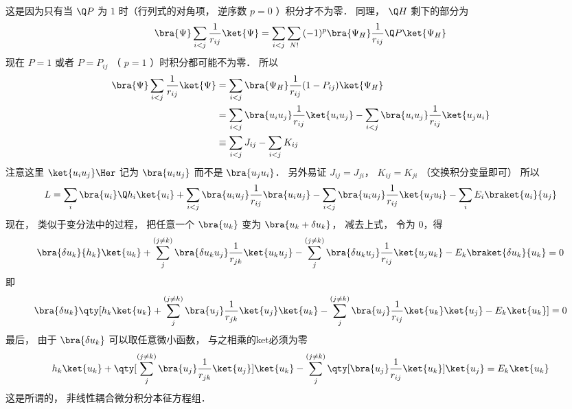 这是因为只有当 $\Q P$ 为 $1$ 时（行列式的对角项， 逆序数 $p = 0$ ）积分才不为零． 同理， $\Q H$ 剩下的部分为
\begin{equation}
\bra{\Psi}\sum_{i < j} \frac{1}{r_{ij}} \ket{\Psi}  = \sum_{i < j} \sum_{N!} {(-1)^p}\bra{\Psi_H}\frac{1}{r_{ij}} \Q P \ket{\Psi_H}
\end{equation}
现在 $P = 1$ 或者 $P = P_{ij}$ （ $p=1$ ）时积分都可能不为零． 所以
\begin{equation}
\begin{aligned}
\bra{\Psi}\sum_{i < j} \frac{1}{r_{ij}} \ket{\Psi} & = \sum_{i < j} \bra{\Psi_H}\frac{1}{r_{ij}}(1 - P_{ij}) \ket{\Psi_H} \\
&= \sum_{i < j} \bra{u_i u_j}\frac{1}{r_{ij}}\ket{u_i u_j}  - \sum_{i < j} \bra{u_i u_j} \frac{1}{r_{ij}} \ket{u_j u_i}\\
& \equiv \sum_{i < j} J_{ij} - \sum_{i < j} K_{ij}\\ 
\end{aligned}
\end{equation}
注意这里 $\ket{u_i u_j}\Her$ 记为 $\bra{u_i u_j}$ 而不是 $\bra{u_j u_i}$．  另外易证 $J_{ij} = J_{ji}$， $K_{ij} = K_{ji}$ （交换积分变量即可） 所以
\begin{equation}
L = \sum_i \bra{u_i} \Q h_i \ket{u_i}  + \sum_{i< j} \bra{u_i u_j}\frac{1}{r_{ij}} \bra{u_i u_j}  - \sum_{i < j} \bra{u_i u_j} \frac{1}{r_{ij}} \ket{u_j u_i}   - \sum_i E_i \braket{u_i}{u_j}
\end{equation}
现在， 类似于变分法中的过程， 把任意一个 $\bra{u_k}$ 变为 $\bra{u_k + \delta u_k}$，  减去上式， 令为 $0$，得
 \begin{equation}
\bra{\delta u_k}{h_k}\ket{u_k}  + \sum_j^{(j \ne k)} \bra{\delta u_k u_j} \frac{1}{r_{jk}} \ket{u_k u_j}  - \sum_j^{(j \ne k)} \bra{\delta u_k u_j}\frac{1}{r_{ij}}\ket{u_j u_k} - E_k \braket{\delta u_k}{u_k}  = 0
\end{equation}
即
 \begin{equation}
\bra{\delta u_k} \qty[h_k \ket{u_k}  + \sum_j^{(j \ne k)} \bra{u_j} \frac{1}{r_{jk}} \ket{u_j} \ket{u_k}  - \sum_j^{(j \ne k)} \bra{u_j}\frac{1}{r_{ij}}\ket{u_k}\ket{u_j}  - E_k\ket{u_k}] = 0
\end{equation}
最后， 由于 $\bra{\delta u_k}$ 可以取任意微小函数， 与之相乘的ket必须为零
\begin{equation}
h_k \ket{u_k}  + \qty[\sum_j^{(j \ne k)} \bra{u_j}\frac{1}{r_{jk}} \ket{u_j}] \ket{u_k}  - \sum_j^{(j \ne k)} \qty[\bra{u_j}\frac{1}{r_{ij}} \ket{u_k}] \ket{u_j} = E_k\ket{u_k} 
\end{equation}
这是所谓的， 非线性耦合微分积分本征方程组．

